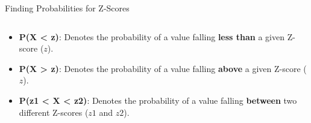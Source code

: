 \documentclass[
  ignorenonframetext,
]{beamer}
\providecommand{\tightlist}{%
  \setlength{\itemsep}{0pt}\setlength{\parskip}{0pt}}
\begin{document}
\begin{frame}{Finding Probabilities for Z-Scores}
\label{finding-probabilities-for-z-scores}
\begin{columns}[T]
\begin{column}{0.48\textwidth}
\vspace{1cm}

\begin{itemize}
\tightlist
\item
  \textbf{P(X \textless{} z)}: Denotes the probability of a value
  falling \textbf{less than} a given Z-score (\(z\)).
\end{itemize}

\vspace{1cm}

\begin{itemize}
\tightlist
\item
  \textbf{P(X \textgreater{} z)}: Denotes the probability of a value
  falling \textbf{above} a given Z-score (\(z\)).
\end{itemize}

\vspace{1cm}

\begin{itemize}
\tightlist
\item
  \textbf{P(z1 \textless{} X \textless{} z2)}: Denotes the probability
  of a value falling \textbf{between} two different Z-scores (\(z1\) and
  \(z2\)).
\end{itemize}
\end{column}


\end{columns}
\end{frame}
\end{document}

